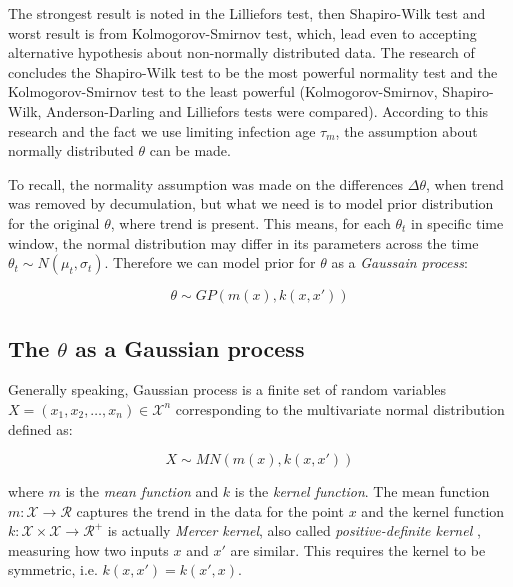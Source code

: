 \documentclass[
  digital, %
  oneside, %
  lof,     %
  lot,     %
]{fithesis4}
\begin{document}
The strongest result is noted in the 
Lilliefors test, then Shapiro-Wilk test and 
worst result is from Kolmogorov-Smirnov test, 
which, lead even to accepting alternative 
hypothesis about non-normally distributed data. 
The research of \cite{razali2011} concludes the 
Shapiro-Wilk test to be the most powerful 
normality test and the Kolmogorov-Smirnov test 
to the least powerful (Kolmogorov-Smirnov, 
Shapiro-Wilk, Anderson-Darling and Lilliefors 
tests were compared). 
According to this research and the fact we 
use limiting infection age $\tau_m$, the 
assumption about normally distributed $\theta$ 
can be made.

To recall, the normality assumption was made 
on the differences $\Delta \theta$, when trend 
was removed by decumulation, but what we need 
is to model prior distribution for the original 
$\theta$, where trend is present. 
This means, for each $\theta_t$ in specific 
time window, the normal distribution may differ 
in its parameters across the time 
$\theta_t \sim N(\mu_t, \sigma_t)$. 
Therefore we can model prior for $\theta$ as a 
\textit{Gaussain process}:

\begin{equation}
\theta \sim GP \left( m \left( x \right), k \left( x, x' \right) \right)
\end{equation}



\subsection{The \texorpdfstring{$\theta$}{Lg} as a Gaussian process}

Generally speaking, Gaussian process 
\cite{rasmussen2004} is a finite set of random 
variables 
$X = (x_1, x_2, \dots, x_n) \in \mathcal{X}^n$ 
corresponding to the multivariate normal 
distribution defined as:

\begin{equation}
X \sim MN \left( m \left( x \right), k \left( x, x' \right) \right)
\end{equation}

where $m$ is the \textit{mean function} and $k$ is the 
\textit{kernel function}. 
The mean function 
$m : \mathcal{X} \to \mathcal{R}$ captures the 
trend in the data for the point $x$ and the 
kernel function 
$k : \mathcal{X} \times \mathcal{X} \to \mathcal{R}^{+}$ 
is actually \textit{Mercer kernel}, also called 
\textit{positive-definite kernel} \cite{murphy2021}, 
measuring how two inputs $x$ and $x'$ are similar. 
This requires the kernel to be symmetric, i.e. 
$k \left( x, x' \right) = k \left( x', x \right)$.
\end{document}
